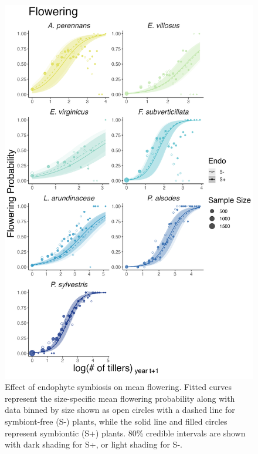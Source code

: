 \documentclass[9pt,twoside,lineno]{pnas-new}
\begin{document}
\begin{figure}
	\centering
	\includegraphics[width=.6\linewidth]{flw_meanplot.png}
	\caption{Effect of endophyte symbiosis on mean flowering. Fitted curves represent the size-specific mean flowering probability along with data binned by size shown as open circles with a dashed line for symbiont-free (S-) plants, while the solid line and filled circles represent symbiontic (S+) plants. 80\% credible intervals are shown with dark shading for  S+, or light shading for S-.}
\end{figure}
\end{document}
